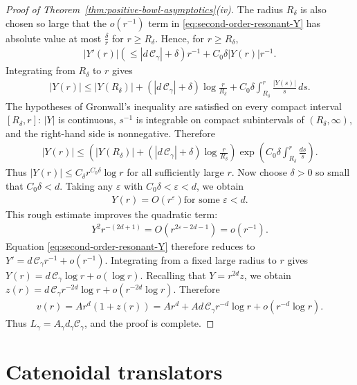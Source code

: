 \documentclass{amsart}
\theoremstyle{plain}
\theoremstyle{mainintrothm}
\theoremstyle{definition}
\begin{document}
\begin{proof}[Proof of Theorem~\ref{thm:positive-bowl-asymptotics}\textup{(iv)}]
		The radius $R_\delta$ is also chosen so large that the $o(r^{-1})$ term in
		\eqref{eq:second-order-resonant-Y} has absolute value at most
		$\frac{\delta}{r}$ for $r\ge R_\delta$.  Hence, for $r\ge R_\delta$,
		\begin{align*}
			|Y'(r)|
			(\le|d\,\mathcal C_\gamma|+\delta)r^{-1}
			+
			C_0\delta|Y(r)|r^{-1}.
		\end{align*}
		Integrating from $R_\delta$ to $r$ gives
		\begin{align*}
			|Y(r)|
			\le
			|Y(R_\delta)|
			+
			(|d\,\mathcal C_\gamma|+\delta)\log\frac{r}{R_\delta}
			+
			C_0\delta\int_{R_\delta}^r\frac{|Y(s)|}{s}\,ds.
		\end{align*}
		The hypotheses of Gronwall's inequality are satisfied on every compact
		interval $[R_\delta,r]$: $|Y|$ is continuous, $s^{-1}$ is integrable on
		compact subintervals of $(R_\delta,\infty)$, and the right-hand side is
		nonnegative.  Therefore
		\begin{align*}
			|Y(r)|
			\le
			\left(
			|Y(R_\delta)|
			+
			(|d\,\mathcal C_\gamma|+\delta)\log\frac{r}{R_\delta}
			\right)
			\exp\left(C_0\delta\int_{R_\delta}^r\frac{ds}{s}\right).
		\end{align*}
		Thus $|Y(r)|\le C_\delta r^{C_0\delta}\log r$ for all sufficiently large
		$r$.  Now choose $\delta>0$ so small that $C_0\delta<d$.  Taking any
		$\varepsilon$ with $C_0\delta<\varepsilon<d$, we obtain
		\begin{align*}
			Y(r)=O(r^\varepsilon)
			\mbox{for some }\varepsilon<d.
		\end{align*}
		This rough estimate improves the quadratic term:
		\begin{align*}
			Y^2r^{-(2d+1)}=
			O(r^{2\varepsilon-2d-1})=
			o\!\left(r^{-1}\right).
		\end{align*}
		Equation \eqref{eq:second-order-resonant-Y} therefore reduces to
		$Y'=d\,\mathcal C_\gamma r^{-1}+o\left(r^{-1}\right)$. Integrating from a fixed large radius to $r$ gives $Y(r)=d\,\mathcal C_\gamma\log r+o(\log r)$. Recalling that $Y=r^{2d}z$, we obtain $z(r)=d\,\mathcal C_\gamma r^{-2d}\log r+o(r^{-2d}\log r)$. Therefore
		\begin{align*}
			v(r)
			=
			Ar^d(1+z(r))
			=
			Ar^d
			+
			Ad\,\mathcal C_\gamma r^{-d}\log r
			+
			o(r^{-d}\log r).
		\end{align*}
		Thus $L_\gamma=A_\gamma d_\gamma\mathcal C_\gamma$, and the proof is
		complete.
	\end{proof}
	

\section{Catenoidal translators}
\label{sec:catenoidal-translators}
\end{document}
